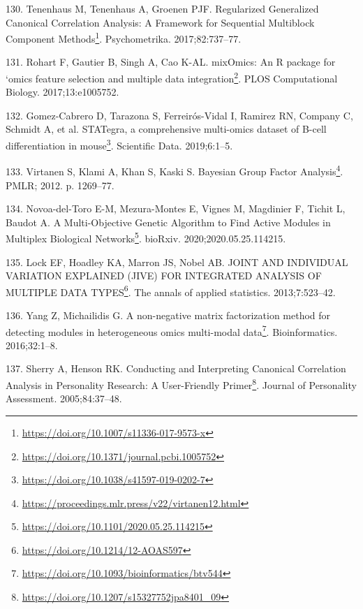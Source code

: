 \documentclass[
  a4paper,
]{book}
\DeclareRobustCommand{\href}[2]{#2\footnote{\url{#1}}}
\newlength{\cslhangindent}
\newlength{\cslentryspacingunit} %
\newenvironment{CSLReferences}[2] %
 {%
  \setlength{\parindent}{0pt}
  \ifodd #1
  \let\oldpar\par
  \def\par{\hangindent=\cslhangindent\oldpar}
  \fi
  \setlength{\parskip}{#2\cslentryspacingunit}
 }%
 {}
\begin{document}
\begin{CSLReferences}{0}{0}
\leavevmode{}%
130. Tenenhaus M, Tenenhaus A, Groenen PJF. \href{https://doi.org/10.1007/s11336-017-9573-x}{Regularized Generalized Canonical Correlation Analysis: A Framework for Sequential Multiblock Component Methods}. Psychometrika. 2017;82:737--77.

\leavevmode{}%
131. Rohart F, Gautier B, Singh A, Cao K-AL. \href{https://doi.org/10.1371/journal.pcbi.1005752}{mixOmics: An R package for {`}omics feature selection and multiple data integration}. PLOS Computational Biology. 2017;13:e1005752.

\leavevmode{}%
132. Gomez-Cabrero D, Tarazona S, Ferreirós-Vidal I, Ramirez RN, Company C, Schmidt A, et al. \href{https://doi.org/10.1038/s41597-019-0202-7}{STATegra, a comprehensive multi-omics dataset of B-cell differentiation in mouse}. Scientific Data. 2019;6:1--5.

\leavevmode{}%
133. Virtanen S, Klami A, Khan S, Kaski S. \href{https://proceedings.mlr.press/v22/virtanen12.html}{Bayesian Group Factor Analysis}. PMLR; 2012. p. 1269--77.

\leavevmode{}%
134. Novoa-del-Toro E-M, Mezura-Montes E, Vignes M, Magdinier F, Tichit L, Baudot A. \href{https://doi.org/10.1101/2020.05.25.114215}{A Multi-Objective Genetic Algorithm to Find Active Modules in Multiplex Biological Networks}. bioRxiv. 2020;2020.05.25.114215.

\leavevmode{}%
135. Lock EF, Hoadley KA, Marron JS, Nobel AB. \href{https://doi.org/10.1214/12-AOAS597}{JOINT AND INDIVIDUAL VARIATION EXPLAINED (JIVE) FOR INTEGRATED ANALYSIS OF MULTIPLE DATA TYPES}. The annals of applied statistics. 2013;7:523--42.

\leavevmode{}%
136. Yang Z, Michailidis G. \href{https://doi.org/10.1093/bioinformatics/btv544}{A non-negative matrix factorization method for detecting modules in heterogeneous omics multi-modal data}. Bioinformatics. 2016;32:1--8.

\leavevmode{}%
137. Sherry A, Henson RK. \href{https://doi.org/10.1207/s15327752jpa8401_09}{Conducting and Interpreting Canonical Correlation Analysis in Personality Research: A User-Friendly Primer}. Journal of Personality Assessment. 2005;84:37--48.


\end{CSLReferences}
\end{document}
